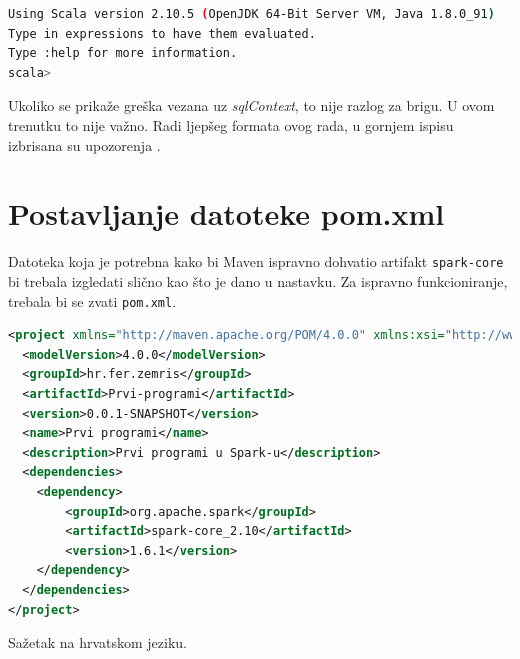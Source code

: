 \documentclass[times, utf8, zavrsni, numeric]{fer}
\begin{document}
\begin{appendices}
\begin{lstlisting}[language=bash]
Using Scala version 2.10.5 (OpenJDK 64-Bit Server VM, Java 1.8.0_91)
Type in expressions to have them evaluated.
Type :help for more information.
scala>
\end{lstlisting}


Ukoliko se prikaže greška vezana uz \emph{sqlContext}, to nije razlog za brigu. U ovom trenutku to nije važno. Radi ljepšeg formata ovog rada, u gornjem ispisu izbrisana su upozorenja .
\chapter{Postavljanje datoteke pom.xml}
\label{ch:datotekapomXML}
Datoteka koja je potrebna kako bi Maven ispravno dohvatio artifakt \texttt{spark-core} bi trebala izgledati slično kao što je dano u nastavku. Za ispravno funkcioniranje, trebala bi se zvati \texttt{pom.xml}.
\begin{lstlisting}[language=XML]
<project xmlns="http://maven.apache.org/POM/4.0.0" xmlns:xsi="http://www.w3.org/2001/XMLSchema-instance" xsi:schemaLocation="http://maven.apache.org/POM/4.0.0 http://maven.apache.org/xsd/maven-4.0.0.xsd">
  <modelVersion>4.0.0</modelVersion>
  <groupId>hr.fer.zemris</groupId>
  <artifactId>Prvi-programi</artifactId>
  <version>0.0.1-SNAPSHOT</version>
  <name>Prvi programi</name>
  <description>Prvi programi u Spark-u</description>
  <dependencies>
  	<dependency>
  		<groupId>org.apache.spark</groupId>
  		<artifactId>spark-core_2.10</artifactId>
  		<version>1.6.1</version>
  	</dependency>
  </dependencies>
</project>
\end{lstlisting}
\end{appendices}

\begin{sazetak}
Sažetak na hrvatskom jeziku.

\end{sazetak}

\begin{abstract}
Abstract.

\end{abstract}
\end{document}
